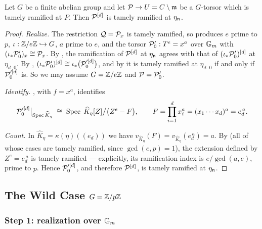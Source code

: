 \begin{theorem}\label{theorem:tame_after_blowup}
    Let $G$ be a finite abelian group and let $\mathcal{P} \to U = C \setminus \mathfrak{m}$ be a
    $G$-torsor which is tamely ramified at $P$. Then $\mathcal{P}^{[d]}$ is tamely
    ramified at $\eta_{\mathfrak{n}}$.
\end{theorem}
\begin{proof}
    \emph{Realize.} The restriction $\mathcal{Q} = \mathcal{P}_x$ is tamely ramified, so
     produces $e$ prime to $p$,
    $\iota: \mathbb{Z}/e\mathbb{Z} \hookrightarrow G$, $a$ prime to $e$, and the torsor
    $\mathcal{P}'_0 : T^e = x^a$ over $\mathbb{G}_m$ with $(\iota_*\mathcal{P}'_0)_x \cong \mathcal{P}_x$. By
    , the ramification of $\mathcal{P}^{[d]}$ at $\eta_{\mathfrak{n}}$
    agrees with that of $(\iota_*\mathcal{P}'_0)^{[d]}$ at $\eta_{d \cdot 0}$. By
    ,
    $(\iota_*\mathcal{P}'_0)^{[d]} \cong \iota_*\bigl(\mathcal{P}'^{[d]}_0\bigr)$, and by
     it is tamely ramified at
    $\eta_{d \cdot 0}$ if and only if $\mathcal{P}'^{[d]}_0$ is. So we may assume
    $G = \mathbb{Z}/e\mathbb{Z}$ and $\mathcal{P} = \mathcal{P}'_0$.

    \emph{Identify.} , with $f = x^a$,
    identifies
    \[
        \mathcal{P}'^{[d]}_0\big|_{\operatorname{Spec} \widehat K_\eta}
        \;\cong\;
        \operatorname{Spec}\; \widehat K_\eta[Z]\big/\bigl(Z^e - F\bigr),
        \qquad
        F = \prod_{i=1}^{d} x_i^a = (x_1 \cdots x_d)^a = e_d^{\,a}.
    \]

    \emph{Count.} In $\widehat K_\eta = \kappa(\eta)((e_d))$ we have
    $v_{\widehat K_\eta}(F) = v_{\widehat K_\eta}(e_d^{\,a}) = a$. By
     (all of whose cases are tamely ramified,
    since $\gcd(e, p) = 1$), the extension defined by $Z^e = e_d^{\,a}$ is tamely
    ramified --- explicitly, its ramification index is $e/\gcd(a, e)$, prime to
    $p$. Hence $\mathcal{P}'^{[d]}_0$, and therefore $\mathcal{P}^{[d]}$, is tamely ramified at
    $\eta_{\mathfrak{n}}$.
\end{proof}

\subsection{\texorpdfstring{The Wild Case $G = \mathbb{Z}/p\mathbb{Z}$}{The Wild Case G = Z/pZ}}\label{subsection:wild_case_Zp}

\subsubsection*{Step 1: realization over $\mathbb{G}_m$}

